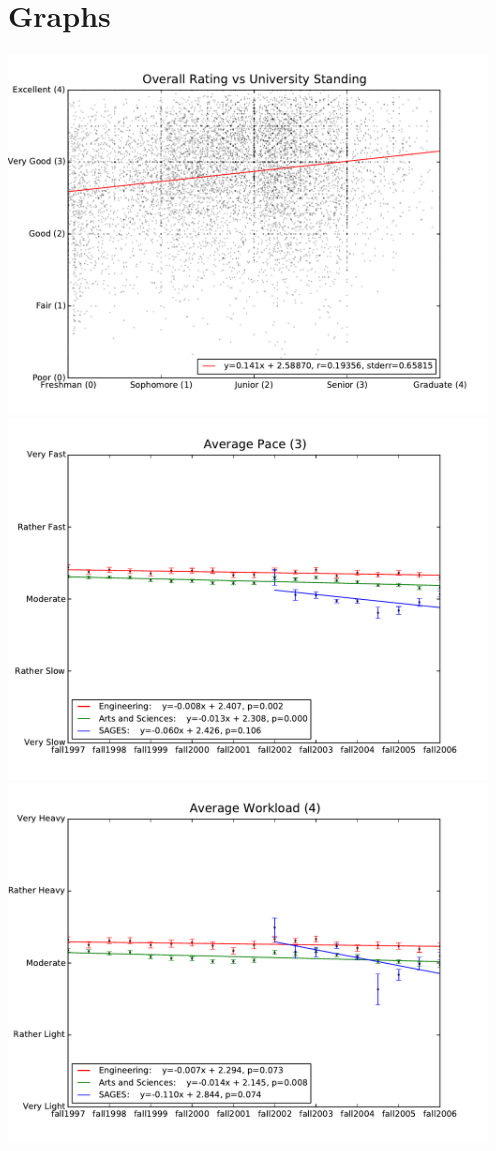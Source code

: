 \documentclass[12pt]{article}
\begin{document}
\section{Graphs}
\begin{center}
    \includegraphics[width=5in]{figures/rating_vs_standing.pdf} \\
    \includegraphics[width=5in]{figures/3_pace_over_time.pdf} \\
    \includegraphics[width=5in]{figures/4_workload_over_time.pdf} \\

\end{center}
\end{document}
